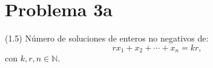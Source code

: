 
\section*{Problema 3a}
(1.5) Número de soluciones de enteros no negativos de:
\[
  r x_1 + x_2 + \cdots + x_n = k r,
\]
con $k, r, n \in \mathbb{N}$.

